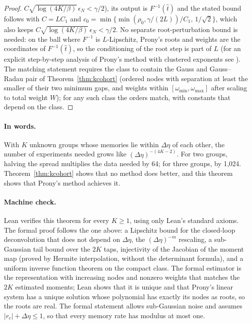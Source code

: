\documentclass[12pt]{article}
\theoremstyle{definition}
\theoremstyle{remark}
\begin{document}
\begin{proof}
$C\sqrt{\log(4K/\beta)}\,\epsilon_N<\gamma/2$), its output is $F^{-1}(\hat t)$ and the stated bound follows with $C=LC_1$ and $c_0=\min\{\min(\rho_0,\gamma/(2L))/C_1,\,1/\sqrt2\}$, which also keeps $C\sqrt{\log(4K/\beta)}\,\epsilon_N<\gamma/2$. No separate root-perturbation bound is needed: on the ball where $F^{-1}$ is $L$-Lipschitz, Prony's roots and weights are the coordinates of $F^{-1}(\hat t)$, so the conditioning of the root step is part of $L$ (for an explicit step-by-step analysis of Prony's method with clustered exponents see \citealp{katz2023}). The matching statement requires the class to contain the Gauss and Gauss--Radau pair of Theorem~\ref{thm:kcohort} (ordered nodes with separation at least the smaller of their two minimum gaps, and weights within $[\omega_{\min},\omega_{\max}]$ after scaling to total weight $W$); for any such class the orders match, with constants that depend on the class.
\end{proof}

\paragraph{In words.} With $K$ unknown groups whose memories lie within $\Delta\eta$ of each other, the number of experiments needed grows like $(\Delta\eta)^{-(4K-2)}$. For two groups, halving the spread multiplies the data needed by 64; for three groups, by 1{,}024. Theorem~\ref{thm:kcohort} shows that no method does better, and this theorem shows that Prony's method achieves it.

\paragraph{Machine check.} Lean verifies this theorem for every $K\ge1$, using only Lean's standard axioms. The formal proof follows the one above: a Lipschitz bound for the closed-loop deconvolution that does not depend on $\Delta\eta$, the $(\Delta\eta)^{-m}$ rescaling, a sub-Gaussian tail bound over the $2K$ taps, injectivity of the Jacobian of the moment map (proved by Hermite interpolation, without the determinant formula), and a uniform inverse function theorem on the compact class. The formal estimator is the representation with increasing nodes and nonzero weights that matches the $2K$ estimated moments; Lean shows that it is unique and that Prony's linear system has a unique solution whose polynomial has exactly its nodes as roots, so the roots are real. The formal statement allows sub-Gaussian noise and assumes $|r_c|+\Delta\eta\le1$, so that every memory rate has modulus at most one.
\end{document}
